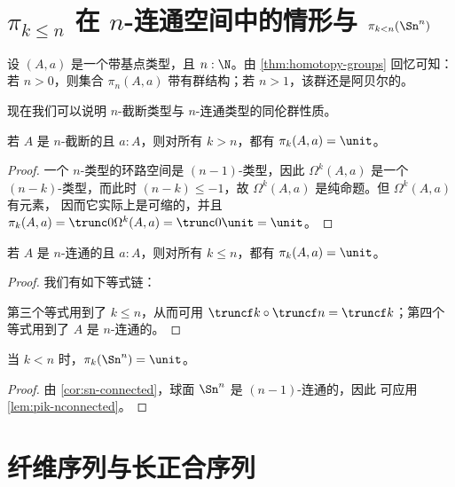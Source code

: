 \section{\texorpdfstring{$\pi_{k \le n}$}{π\_(k≤n)} 在 \texorpdfstring{$n$}{n}-连通空间中的情形与 \texorpdfstring{$\pi_{k < n}(\Sn ^n)$}{π\_(k<n)(Sⁿ)}}
\label{sec:pik-le-n}

设 $(A,a)$ 是一个带基点类型，且 $n:\N$。由
\cref{thm:homotopy-groups} 回忆可知：若 $n>0$，则集合 $\pi_n(A,a)$ 带有群结构；若 $n>1$，该群还是阿贝尔的。

现在我们可以说明 $n$-截断类型与 $n$-连通类型的同伦群性质。

\begin{lem}
  若 $A$ 是 $n$-截断的且 $a:A$，则对所有 $k>n$，都有 $\pi_k(A,a)=\unit$。
\end{lem}

\begin{proof}
  一个 $n$-类型的环路空间是
  $(n-1)$-类型，因此 $\Omega^k(A,a)$ 是一个 $(n-k)$-类型，而此时
  $(n-k)\le-1$，故 $\Omega^k(A,a)$ 是纯命题。但 $\Omega^k(A,a)$ 有元素，
  因而它实际上是可缩的，并且
  $\pi_k(A,a)=\trunc0{\Omega^k(A,a)}=\trunc0{\unit}=\unit$。
\end{proof}

\begin{lem} \label{lem:pik-nconnected}
  若 $A$ 是 $n$-连通的且 $a:A$，则对所有 $k\le{}n$，都有 $\pi_k(A,a)=\unit$。
\end{lem}

\begin{proof}
  我们有如下等式链：
  第三个等式用到了 $k\le{}n$，从而可用
  $\truncf k\circ\truncf n=\truncf k$；第四个等式用到了 $A$
  是 $n$-连通的。
\end{proof}

\begin{cor}
  当 $k < n$ 时，$\pi_k(\Sn ^n) = \unit$。
\end{cor}
\begin{proof}
  由 \cref{cor:sn-connected}，球面 $\Sn^n$ 是 $(n-1)$-连通的，因此
  可应用 \cref{lem:pik-nconnected}。
\end{proof}
\section{纤维序列与长正合序列}
\label{sec:long-exact-sequence-homotopy-groups}

